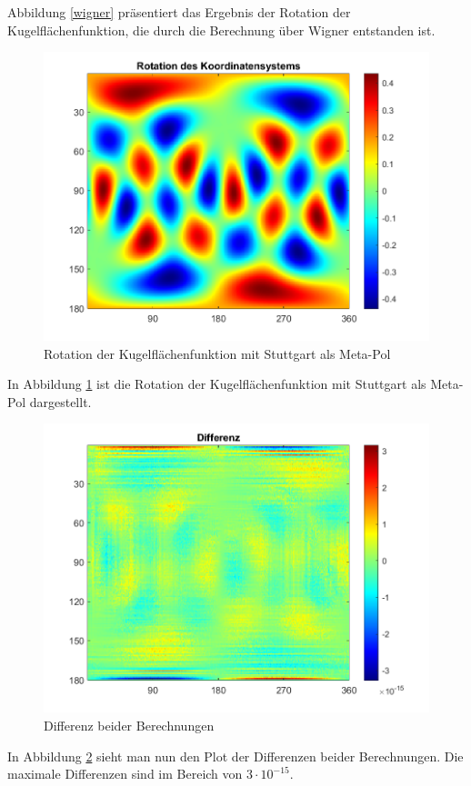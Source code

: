 Abbildung \ref{wigner} präsentiert das Ergebnis der Rotation der Kugelflächenfunktion, die durch die Berechnung über Wigner entstanden ist. 
\begin{figure}[H]
	\centering
	\includegraphics[scale = 0.6]{rotiert.png}
	\caption{Rotation der Kugelflächenfunktion mit Stuttgart als Meta-Pol}
	\label{rot}
\end{figure}
In Abbildung \ref{rot} ist die Rotation der Kugelflächenfunktion mit Stuttgart als Meta-Pol dargestellt. 
\begin{figure}[H]
 	\centering
 	\includegraphics[scale = 0.6]{diff.png}
 	\caption{Differenz beider Berechnungen}
 	\label{diff}
\end{figure}
In Abbildung \ref{diff} sieht man nun den Plot der Differenzen beider Berechnungen. Die maximale Differenzen sind im Bereich von $3 \cdot 10^{-15}$.